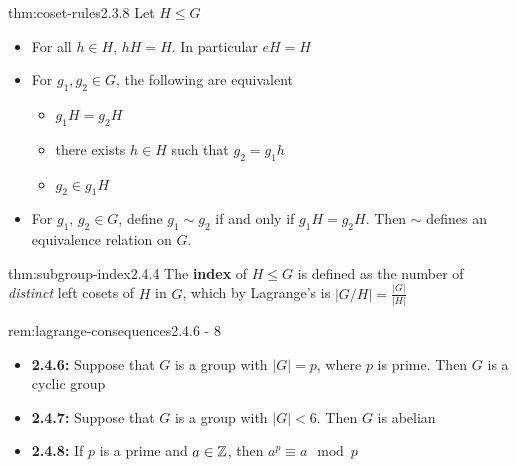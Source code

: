 \documentclass[landscape, 8pt]{extarticle}
\begin{document}
\begin{multicols}{3}
\begin{thm}{thm:coset-rules}{2.3.8}
Let $H\le G$
\renewcommand\labelitemi{\tiny$\bullet$}
\begin{itemize}
    \vspace{-5pt}
    \setlength\itemsep{0em}
    \item For all $h\in H$, $hH = H$. In particular $eH = H$
    \item For $g_{1}, g_{2}\in G$, the following are equivalent
    \vspace{-5pt}
    \renewcommand\labelitemi{\tiny$\bullet$}
    \begin{itemize}
        \setlength\itemsep{0em}
        \item $g_{1}H = g_{2}H$
        \item there exists $h\in H$ such that $g_{2} = g_{1}h$
        \item $g_{2}\in g_{1}H$
    \end{itemize}
    \item For $g_{1},\,g_{2}\in G$, define $g_{1}\sim g_{2}$ if and only if $g_{1}H=g_{2}H$. Then $\sim$ defines an equivalence relation on $G$.
\end{itemize}
\end{thm}
\vspace{-5pt}

\begin{thm}{thm:subgroup-index}{2.4.4}
The \textbf{index} of $H\le G$ is defined as the number of \textit{distinct} left cosets of $H$ in $G$, which by Lagrange's is $\lvert G / H\rvert = \frac{\lvert G\rvert}{\lvert H\rvert }$
\end{thm}
\vspace{-5pt}

\begin{rem}{rem:lagrange-consequences}{2.4.6 - 8}
\renewcommand\labelitemi{\tiny$\bullet$}
\begin{itemize}
    \setlength\itemsep{0em}
    \item \textbf{2.4.6:} Suppose that $G$ is a group with $\lvert G \rvert=p$, where $p$ is prime. Then $G$ is a cyclic group
    \item \textbf{2.4.7:} Suppose that $G$ is a group with $\lvert G \rvert < 6$. Then $G$ is abelian
    \item \textbf{2.4.8:} If $p$ is a prime and $a\in \mathbb{Z}$, then $a^{p} \equiv a \mod{p}$
\end{itemize}
\end{rem}
\vspace{-5pt}


\end{multicols}
\end{document}
